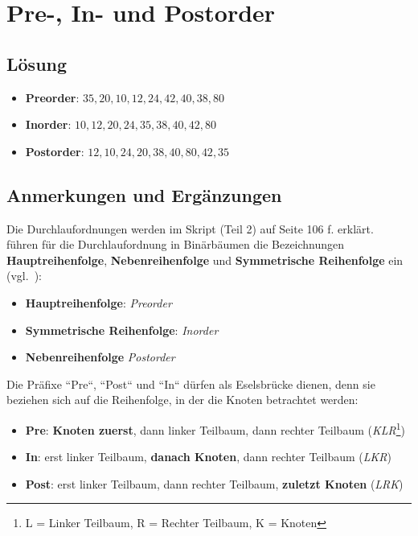 \chapter{Pre-, In- und Postorder}

\section*{Lösung}

\begin{itemize}
    \item \textbf{Preorder}: $35, 20,  10,  12,  24,  42,  40,  38,  80$
    \item \textbf{Inorder}: $10,  12,  20,  24,  35,  38,  40,  42,  80$
    \item \textbf{Postorder}: $12,  10,  24,  20,  38,  40,  80,  42,  35$
\end{itemize}


\section*{Anmerkungen und Ergänzungen}

Die Durchlaufordnungen werden im Skript (Teil 2) auf Seite 106 f. erklärt.
\\


 führen für die Durchlaufordnung in Binärbäumen die Bezeichnungen \textbf{Hauptreihenfolge},
\textbf{Nebenreihenfolge} und \textbf{Symmetrische Reihenfolge} ein (vgl.~\cite[272]{OW17e}):

\begin{itemize}
    \item \textbf{Hauptreihenfolge}: \textit{Preorder}
    \item \textbf{Symmetrische Reihenfolge}: \textit{Inorder}
    \item \textbf{Nebenreihenfolge} \textit{Postorder}
\end{itemize}

Die Präfixe ``Pre``, ``Post`` und ``In`` dürfen als Eselsbrücke dienen, denn sie beziehen sich auf die Reihenfolge, in der die Knoten betrachtet werden:

\begin{itemize}
    \item \textbf{Pre}: \textbf{Knoten zuerst}, dann linker Teilbaum, dann rechter Teilbaum (\textit{KLR}\footnote{L = Linker Teilbaum, R = Rechter Teilbaum, K = Knoten})
    \item \textbf{In}: erst linker Teilbaum, \textbf{danach Knoten}, dann rechter Teilbaum (\textit{LKR})
    \item \textbf{Post}:  erst linker Teilbaum, dann rechter Teilbaum, \textbf{zuletzt Knoten} (\textit{LRK})
\end{itemize}

